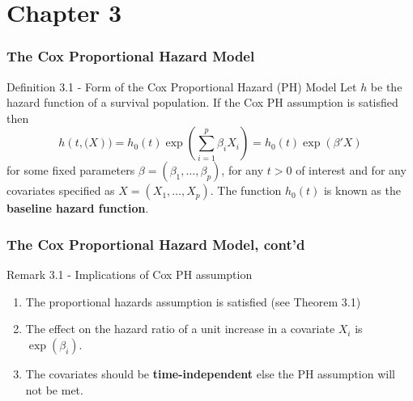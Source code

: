 \documentclass{beamer}
\theoremstyle{definition}
\begin{document}
%
%


\section{Chapter 3}

\begin{frame} 
\frametitle{The Cox Proportional Hazard Model} 
\begin{block}{Definition 3.1 - Form of the Cox Proportional Hazard (PH) Model} 
Let $h$ be the hazard function of a survival population. If the Cox PH assumption is satisfied then
\[
h(t,\mathbf(X)) = h_0(t)\exp(\sum_{i=1}^p \beta_i X_i) = h_0(t)\exp(\beta' X) 
\]
for some fixed parameters $\beta=(\beta_1,\ldots,\beta_p)$, for any $t>0$ of interest and for any covariates specified as $X=(X_1,\ldots,X_p)$. The function $h_0(t)$ is known as the \textbf{baseline hazard function}.
\end{block} 
\end{frame}  

\begin{frame}
\frametitle{The Cox Proportional Hazard Model, cont'd} 
\begin{block}{Remark 3.1 - Implications of Cox PH assumption}
\begin{enumerate}
\item The proportional hazards assumption is satisfied (see Theorem 3.1) 
\item The effect on the hazard ratio of a unit increase in a covariate $X_i$ is $\exp(\beta_i)$. 
\item The covariates should be \textbf{time-independent} else the PH assumption will not be met. 
\end{enumerate}
\end{block} 
\end{frame} 
\end{document}
